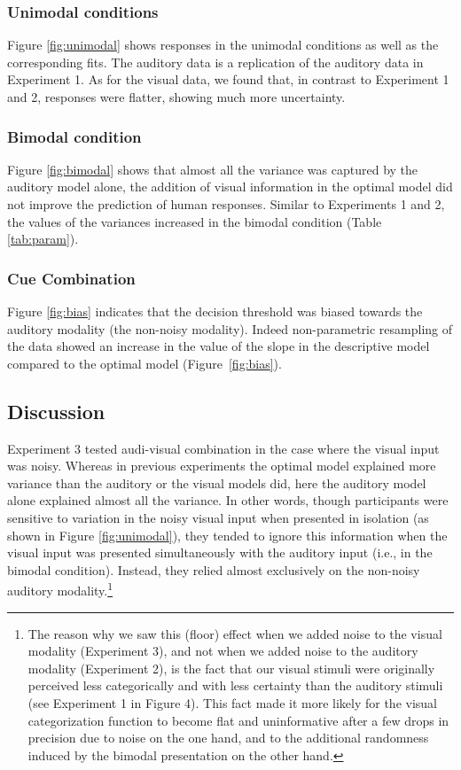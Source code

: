 \documentclass[english,,man,floatsintext]{apa6}
\let\rmarkdownfootnote\footnote%
\def\footnote{\protect\rmarkdownfootnote}
\theoremstyle{definition}
\theoremstyle{definition}
\theoremstyle{definition}
\theoremstyle{remark}
\begin{document}
\subsubsection{Unimodal conditions}\label{unimodal-conditions-2}

Figure \ref{fig:unimodal} shows responses in the unimodal conditions as
well as the corresponding fits. The auditory data is a replication of
the auditory data in Experiment 1. As for the visual data, we found
that, in contrast to Experiment 1 and 2, responses were flatter, showing
much more uncertainty.

\subsubsection{Bimodal condition}\label{bimodal-condition-3}

Figure \ref{fig:bimodal} shows that almost all the variance was captured
by the auditory model alone, the addition of visual information in the
optimal model did not improve the prediction of human responses. Similar
to Experiments 1 and 2, the values of the variances increased in the
bimodal condition (Table \ref{tab:param}).

\subsubsection{Cue Combination}\label{cue-combination-2}

Figure \ref{fig:bias} indicates that the decision threshold was biased
towards the auditory modality (the non-noisy modality). Indeed
non-parametric resampling of the data showed an increase in the value of
the slope in the descriptive model compared to the optimal model
(Figure~\ref{fig:bias}).

\subsection{Discussion}\label{discussion-2}

Experiment 3 tested audi-visual combination in the case where the visual
input was noisy. Whereas in previous experiments the optimal model
explained more variance than the auditory or the visual models did, here
the auditory model alone explained almost all the variance. In other
words, though participants were sensitive to variation in the noisy
visual input when presented in isolation (as shown in Figure
\ref{fig:unimodal}), they tended to ignore this information when the
visual input was presented simultaneously with the auditory input (i.e.,
in the bimodal condition). Instead, they relied almost exclusively on
the non-noisy auditory
modality.\footnote{The reason why we saw this (floor) effect when we added noise to the visual modality (Experiment 3), and not when we added noise to the auditory modality (Experiment 2), is the fact that our visual stimuli were originally perceived less categorically and with less certainty than the auditory stimuli (see Experiment 1 in Figure 4). This fact made it more likely for the visual categorization function to become flat and uninformative after a few drops in precision due to noise on the one hand, and to the additional randomness induced by the bimodal presentation on the other hand.}
\end{document}
